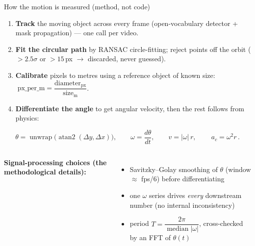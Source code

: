 \documentclass[aspectratio=169,10pt]{beamer}
\begin{document}
\begin{frame}{How the motion is measured (method, not code)}
\small
\begin{enumerate}\setlength\itemsep{4pt}
  \item \textbf{Track} the moving object across every frame (open-vocabulary detector + mask propagation) --- one call per video.
  \item \textbf{Fit the circular path} by RANSAC circle-fitting; reject points off the orbit ($>2.5\sigma$ or $>15$\,px $\to$ discarded, never guessed).
  \item \textbf{Calibrate} pixels to metres using a reference object of known size: $\;\text{px\_per\_m}=\dfrac{\text{diameter}_{\text{px}}}{\text{size}_{\text{m}}}$.
  \item \textbf{Differentiate the angle} to get angular velocity, then the rest follows from physics:
\end{enumerate}
\vspace{-0.2em}
\[
\theta=\operatorname{unwrap}\big(\operatorname{atan2}(\Delta y,\Delta x)\big),\qquad
\omega=\frac{d\theta}{dt},\qquad
v=\lvert\omega\rvert\,r,\qquad
\boxed{\,a_c=\omega^{2} r\,}.
\]
\vspace{-0.2em}
\begin{columns}[T]
{\footnotesize \textbf{Signal-processing choices (the methodological details):}}
\begin{itemize}\setlength\itemsep{1pt}\footnotesize
  \item Savitzky--Golay smoothing of $\theta$ (window $\approx$ fps/6) before differentiating
  \item one $\omega$ series drives \emph{every} downstream number (no internal inconsistency)
  \item period $T=\dfrac{2\pi}{\operatorname{median}|\omega|}$, cross-checked by an FFT of $\theta(t)$
\end{itemize}
\centering
{}
\end{columns}
\end{frame}
\end{document}
